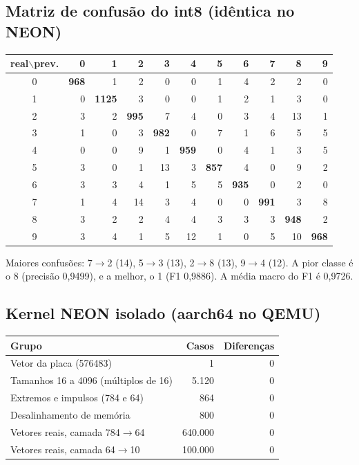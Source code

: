 \documentclass[10pt]{article}
\begin{document}
\subsection{Matriz de confusão do int8 (idêntica no NEON)}
\begin{center}\footnotesize
\setlength{\tabcolsep}{3.2pt}
\begin{tabular}{@{}c|rrrrrrrrrr@{}}
real$\backslash$prev. & 0 & 1 & 2 & 3 & 4 & 5 & 6 & 7 & 8 & 9 \\
\midrule
0 & \textbf{968} & 1 & 2 & 0 & 0 & 1 & 4 & 2 & 2 & 0 \\
1 & 0 & \textbf{1125} & 3 & 0 & 0 & 1 & 2 & 1 & 3 & 0 \\
2 & 3 & 2 & \textbf{995} & 7 & 4 & 0 & 3 & 4 & 13 & 1 \\
3 & 1 & 0 & 3 & \textbf{982} & 0 & 7 & 1 & 6 & 5 & 5 \\
4 & 0 & 0 & 9 & 1 & \textbf{959} & 0 & 4 & 1 & 3 & 5 \\
5 & 3 & 0 & 1 & 13 & 3 & \textbf{857} & 4 & 0 & 9 & 2 \\
6 & 3 & 3 & 4 & 1 & 5 & 5 & \textbf{935} & 0 & 2 & 0 \\
7 & 1 & 4 & 14 & 3 & 4 & 0 & 0 & \textbf{991} & 3 & 8 \\
8 & 3 & 2 & 2 & 4 & 4 & 3 & 3 & 3 & \textbf{948} & 2 \\
9 & 3 & 4 & 1 & 5 & 12 & 1 & 0 & 5 & 10 & \textbf{968} \\
\end{tabular}
\end{center}
Maiores confusões: 7$\to$2 (14), 5$\to$3 (13), 2$\to$8 (13), 9$\to$4 (12). A pior classe é o 8
(precisão 0,9499), e a melhor, o 1 (F1 0,9886). A média macro do F1 é 0,9726.

\subsection{Kernel NEON isolado (aarch64 no QEMU)}
\begin{center}\footnotesize
\begin{tabular}{@{}lrr@{}}
\toprule
Grupo & Casos & Diferenças \\
\midrule
Vetor da placa (576483) & 1 & 0 \\
Tamanhos 16 a 4096 (múltiplos de 16) & 5.120 & 0 \\
Extremos e impulsos (784 e 64) & 864 & 0 \\
Desalinhamento de memória & 800 & 0 \\
Vetores reais, camada 784$\to$64 & 640.000 & 0 \\
Vetores reais, camada 64$\to$10 & 100.000 & 0 \\
\bottomrule
\end{tabular}
\end{center}
\end{document}
